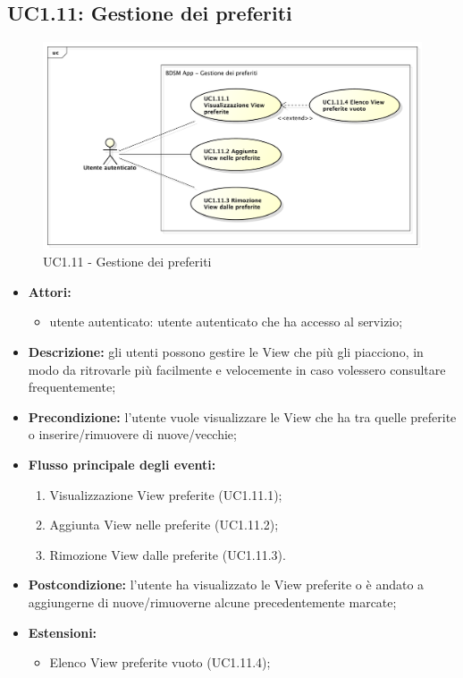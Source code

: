 \pagebreak


\subsection{UC1.11: Gestione dei preferiti}
\begin{figure}[htbp]
	\centering
	\centerline{\includegraphics[scale=0.50]{./images/UC1_11.pdf}}
	\caption{UC1.11 - Gestione dei preferiti}
\end{figure}

\begin{itemize}
	\item \textbf{Attori:}
	\begin{itemize}
		\item utente autenticato: utente autenticato che ha accesso al servizio;
	\end{itemize}
	\item \textbf{Descrizione:} gli utenti possono gestire le View che più gli piacciono, in modo da ritrovarle più facilmente e velocemente in caso volessero consultare frequentemente;
	\item \textbf{Precondizione:} l'utente vuole visualizzare le View che ha tra quelle preferite o inserire/rimuovere di nuove/vecchie;
	\item \textbf{Flusso principale degli eventi:}
	\begin{enumerate}
		\item Visualizzazione View preferite (UC1.11.1);
		\item Aggiunta View nelle preferite (UC1.11.2);
		\item Rimozione View dalle preferite (UC1.11.3).
	\end{enumerate}
	\item \textbf{Postcondizione:} l'utente ha visualizzato le View preferite o è andato a aggiungerne di nuove/rimuoverne alcune precedentemente marcate;
	\item \textbf{Estensioni:}
	\begin{itemize}
		\item Elenco View preferite vuoto (UC1.11.4);
	\end{itemize}
\end{itemize}

